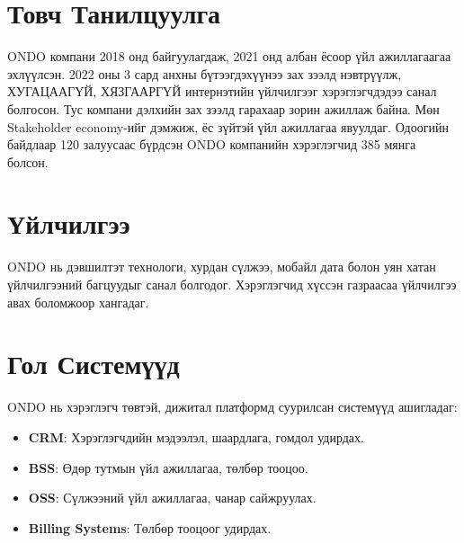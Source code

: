 \section{Товч Танилцуулга}
ONDO компани 2018 онд байгуулагдаж, 2021 онд албан ёсоор үйл ажиллагаагаа эхлүүлсэн. 2022 оны 3 сард анхны бүтээгдэхүүнээ зах зээлд нэвтрүүлж, ХУГАЦААГҮЙ, ХЯЗГААРГҮЙ интернэтийн үйлчилгээг хэрэглэгчдэдээ санал болгосон. Тус компани дэлхийн зах зээлд гарахаар зорин ажиллаж байна. Мөн Stakeholder economy-ийг дэмжиж, ёс зүйтэй үйл ажиллагаа явуулдаг. Одоогийн байдлаар 120 залуусаас бүрдсэн ONDO компанийн хэрэглэгчид 385 мянга болсон.

\section{Үйлчилгээ}
ONDO нь дэвшилтэт технологи, хурдан сүлжээ, мобайл дата болон уян хатан үйлчилгээний багцуудыг санал болгодог. Хэрэглэгчид хүссэн газраасаа үйлчилгээ авах боломжоор хангадаг.

\section{Гол Системүүд}
ONDO нь хэрэглэгч төвтэй, дижитал платформд суурилсан системүүд ашигладаг:
\begin{itemize}
    \item \textbf{CRM}: Хэрэглэгчдийн мэдээлэл, шаардлага, гомдол удирдах.
    \item \textbf{BSS}: Өдөр тутмын үйл ажиллагаа, төлбөр тооцоо.
    \item \textbf{OSS}: Сүлжээний үйл ажиллагаа, чанар сайжруулах.
    \item \textbf{Billing Systems}: Төлбөр тооцоог удирдах.
\end{itemize}
